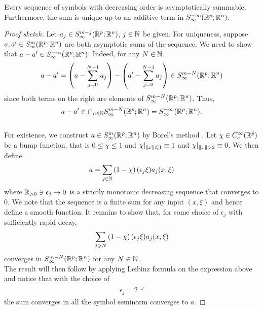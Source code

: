 \documentclass[12pt]{article}
\begin{document}
\begin{flemma}
    Every sequence of symbols with decreasing order is asymptotically summable.  Furthermore, the sum is unique up to an additive term in $S^{-\infty}_\infty(\R^{p}; \R^n)$. 
\end{flemma}
\begin{proof}[Proof sketch]
    Let $a_j \in S^{m-j}_\infty(\R^{p}; \R^n)$, $j \in \N$ be given. For uniqueness, suppose $a, a' \in S^{m}_\infty(\R^{p}; \R^n)$ are both asymptotic sums of the sequence. We need to show that $a - a' \in S^{-\infty}_\infty(\R^{p}; \R^n)$. Indeed, for any $N \in \N$, 
    \begin{align*}
        a - a' = \brac{a - \sum_{j = 0}^{N -1} a_j } - \brac{a' - \sum_{j = 0}^{N -1} a_j } \in S^{m -N}_\infty(\R^{p}; \R^n)
    \end{align*}
    since both terms on the right are elements of $S^{m -N}_\infty(\R^{p}; \R^n)$. Thus, 
    $$a - a' \in \cap_{n \in \N} S^{m -N}_\infty(\R^{p}; \R^n) = S^{-\infty}_\infty(\R^{p}; \R^n).$$ 
    \\
    For existence, we construct $a \in S^{m}_\infty(\R^{p}; \R^n)$ by Borel's method \cite{}. Let $\chi \in C^{\infty}_c(\R^p)$ be a bump function, that is $0 \leq \chi \leq 1$ and $\chi|_{\norm[x] \leq 1} \equiv 1$ and $\chi|_{\norm[x] >2} \equiv 0$. We then define
    \begin{align*}
        a = \sum_{j \in \N} \brac{1 - \chi}(\epsilon_j \xi) a_j(x, \xi)
    \end{align*}
    where $\R_{> 0} \ni \epsilon_j \to 0 $ is a strictly monotonic decreasing sequence that converges to $0$. We note that the sequence is a finite sum for any input $(x, \xi)$ and hence define a smooth function. It remains to show that, for some choice of $\epsilon_j$ with sufficiently rapid decay, 
    \begin{align*}
        \sum_{j \geq N} \brac{1 - \chi}(\epsilon_j \xi) a_j(x, \xi) 
    \end{align*}
    converges in $S^{m -N}_\infty(\R^{p}; \R^n)$ for any $N \in \N$. 
    \\
    The result will then follow by applying Leibinz formula on the expression above and notice that with the choice of 
    \begin{align*}
    \epsilon_j = 2^{-j}
    \end{align*}
    the sum converges in all the  symbol seminorm converges to $a$. 
    
\end{proof}
\end{document}

